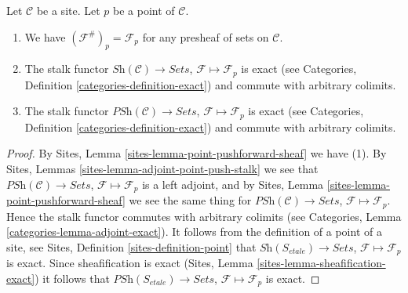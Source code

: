 \begin{lemma}
\label{lemma-stalk-exact}
Let $\mathcal{C}$ be a site.
Let $p$ be a point of $\mathcal{C}$.
\begin{enumerate}
\item We have $(\mathcal{F}^\#)_p = \mathcal{F}_p$
for any presheaf of sets on $\mathcal{C}$.
\item The stalk functor
$\textit{Sh}(\mathcal{C}) \to \textit{Sets}$,
$\mathcal{F} \mapsto \mathcal{F}_p$ is exact (see
Categories, Definition \ref{categories-definition-exact})
and commute with arbitrary colimits.
\item The stalk functor
$\textit{PSh}(\mathcal{C}) \to \textit{Sets}$,
$\mathcal{F} \mapsto \mathcal{F}_p$ is exact (see
Categories, Definition \ref{categories-definition-exact})
and commute with arbitrary colimits.
\end{enumerate}
\end{lemma}

\begin{proof}
By
Sites, Lemma \ref{sites-lemma-point-pushforward-sheaf}
we have (1).
By
Sites, Lemmas \ref{sites-lemma-adjoint-point-push-stalk}
we see that
$\textit{PSh}(\mathcal{C}) \to \textit{Sets}$,
$\mathcal{F} \mapsto \mathcal{F}_p$ is a left adjoint,
and by
Sites, Lemma \ref{sites-lemma-point-pushforward-sheaf}
we see the same thing for
$\textit{PSh}(\mathcal{C}) \to \textit{Sets}$,
$\mathcal{F} \mapsto \mathcal{F}_p$.
Hence the stalk functor commutes with arbitrary colimits (see
Categories, Lemma \ref{categories-lemma-adjoint-exact}).
It follows from the definition of a point of a site, see
Sites, Definition \ref{sites-definition-point}
that $\textit{Sh}(S_{etale}) \to \textit{Sets}$,
$\mathcal{F} \mapsto \mathcal{F}_p$
is exact. Since sheafification is exact
(Sites, Lemma \ref{sites-lemma-sheafification-exact})
it follows that $\textit{PSh}(S_{etale}) \to \textit{Sets}$,
$\mathcal{F} \mapsto \mathcal{F}_p$
is exact.
\end{proof}

